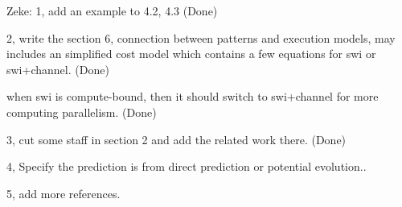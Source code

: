 Zeke:
1, add an example to 4.2, 4.3 (Done)

2, write the section 6, connection between patterns and execution models, may includes an simplified cost model which contains a few equations for swi or swi+channel. (Done)

when swi is compute-bound, then it should switch to swi+channel for more computing parallelism.  (Done)

3, cut some staff in section 2 and add the related work there.  (Done)

4, Specify the prediction is from direct prediction or potential evolution..

5, add more references. 